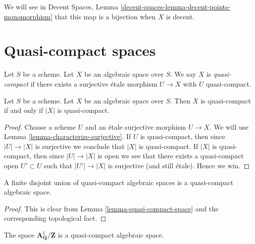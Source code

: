 \noindent
We will see in
Decent Spaces,
Lemma \ref{decent-spaces-lemma-decent-points-monomorphism}
that this map is a bijection when $X$ is decent.

















\section{Quasi-compact spaces}
\label{section-quasi-compact}

\begin{definition}
\label{definition-quasi-compact}
Let $S$ be a scheme.
Let $X$ be an algebraic space over $S$.
We say $X$ is {\it quasi-compact} if there exists a surjective
\'etale morphism $U \to X$ with $U$ quasi-compact.
\end{definition}

\begin{lemma}
\label{lemma-quasi-compact-space}
Let $S$ be a scheme.
Let $X$ be an algebraic space over $S$.
Then $X$ is quasi-compact if and only if $|X|$ is quasi-compact.
\end{lemma}

\begin{proof}
Choose a scheme $U$ and an \'etale surjective morphism $U \to X$.
We will use Lemma \ref{lemma-characterize-surjective}.
If $U$ is quasi-compact, then since $|U| \to |X|$ is surjective
we conclude that $|X|$ is quasi-compact.
If $|X|$ is quasi-compact, then since $|U| \to |X|$ is open
we see that there exists a quasi-compact open $U' \subset U$
such that $|U'| \to |X|$ is surjective (and still \'etale).
Hence we win.
\end{proof}

\begin{lemma}
\label{lemma-finite-disjoint-quasi-compact}
A finite disjoint union of quasi-compact algebraic spaces is
a quasi-compact algebraic space.
\end{lemma}

\begin{proof}
This is clear from
Lemma \ref{lemma-quasi-compact-space}
and the corresponding topological fact.
\end{proof}

\begin{example}
\label{example-quasi-compact-not-very-reasonable}
The space $\mathbf{A}^1_{\mathbf{Q}}/\mathbf{Z}$ is a quasi-compact
algebraic space.
\end{example}

